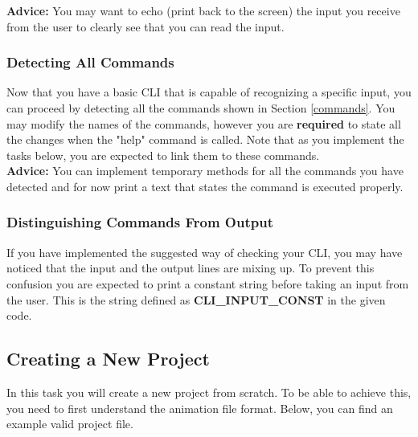 \documentclass[a4paper]{article}
\begin{document}
	\noindent \textbf{Advice:} You may want to echo (print back to the screen) the input you receive from the user to clearly see that you can read the input.
	
	\subsubsection{Detecting All Commands}
	
	Now that you have a basic CLI that is capable of recognizing a specific input, you can proceed by detecting all the commands shown in Section \ref{commands}. You may modify the names of the commands, however you are \textbf{required} to state all the changes when the "help" command is called. Note that as you implement the tasks below, you are expected to link them to these commands. \\
	
	\noindent \textbf{Advice:} You can implement temporary methods for all the commands you have detected and for now print a text that states the command is executed properly.
	
	\subsubsection{Distinguishing Commands From Output}
	
	If you have implemented the suggested way of checking your CLI, you may have noticed that the input and the output lines are mixing up. To prevent this confusion you are expected to print a constant string before taking an input from the user. This is the string defined as \textbf{CLI\_INPUT\_CONST} in the given code.

	\subsection{Creating a New Project}
	In this task you will create a new project from scratch. To be able to achieve this, you need to first understand the animation file format. Below, you can find an example valid project file.
	\label{example}
	\begin{center}
	\end{center}
\end{document}
